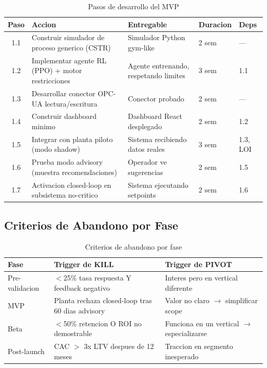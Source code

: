 \documentclass[11pt,a4paper]{article}
\begin{document}
\begin{table}[h]
\centering
\small
\begin{tabular}{c p{5cm} p{4cm} p{1.5cm} p{1.5cm}}
\toprule
\textbf{Paso} & \textbf{Accion} & \textbf{Entregable} & \textbf{Duracion} & \textbf{Deps} \\
\midrule
1.1 & Construir simulador de proceso generico (CSTR) & Simulador Python gym-like & 2 sem & --- \\
1.2 & Implementar agente RL (PPO) + motor restricciones & Agente entrenando, respetando limites & 3 sem & 1.1 \\
1.3 & Desarrollar conector OPC-UA lectura/escritura & Conector probado & 2 sem & --- \\
1.4 & Construir dashboard minimo & Dashboard React desplegado & 2 sem & 1.2 \\
1.5 & Integrar con planta piloto (modo shadow) & Sistema recibiendo datos reales & 3 sem & 1.3, LOI \\
1.6 & Prueba modo advisory (muestra recomendaciones) & Operador ve sugerencias & 2 sem & 1.5 \\
1.7 & Activacion closed-loop en subsistema no-critico & Sistema ejecutando setpoints & 2 sem & 1.6 \\
\bottomrule
\end{tabular}
\caption{Pasos de desarrollo del MVP}
\end{table}

\subsection{Criterios de Abandono por Fase}

\begin{table}[h]
\centering
\begin{tabular}{l p{5cm} p{5cm}}
\toprule
\textbf{Fase} & \textbf{Trigger de KILL} & \textbf{Trigger de PIVOT} \\
\midrule
Pre-validacion & $<$25\% tasa respuesta Y feedback negativo & Interes pero en vertical diferente \\
MVP & Planta rechaza closed-loop tras 60 dias advisory & Valor no claro $\rightarrow$ simplificar scope \\
Beta & $<$50\% retencion O ROI no demostrable & Funciona en un vertical $\rightarrow$ especializarse \\
Post-launch & CAC $>$ 3x LTV despues de 12 meses & Traccion en segmento inesperado \\
\bottomrule
\end{tabular}
\caption{Criterios de abandono por fase}
\end{table}
\end{document}
